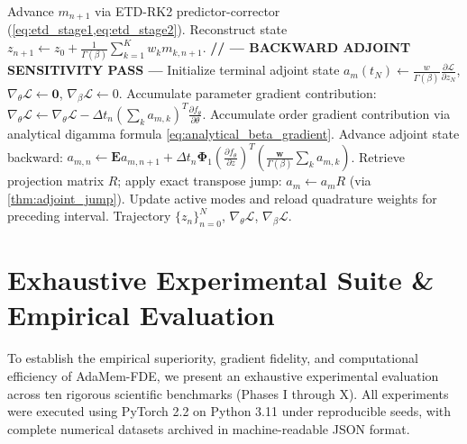 \documentclass[11pt,a4paper]{article}
\theoremstyle{plain}
\theoremstyle{definition}
\newcommand{\dt}{\Delta t}
\begin{document}
\begin{algorithm}[H]
\begin{algorithmic}[1]
    \State Advance $m_{n+1}$ via ETD-RK2 predictor-corrector (\cref{eq:etd_stage1,eq:etd_stage2}).
    \State Reconstruct state $z_{n+1} \leftarrow z_0 + \frac{1}{\Gamma(\beta)} \sum_{k=1}^K w_k m_{k, n+1}$.
\EndFor
\Statex \textbf{// --- BACKWARD ADJOINT SENSITIVITY PASS ---}
\State Initialize terminal adjoint state $a_m(t_N) \leftarrow \frac{w}{\Gamma(\beta)} \frac{\partial \mathcal{L}}{\partial z_N}$, $\nabla_\theta \mathcal{L} \leftarrow \mathbf{0}$, $\nabla_\beta \mathcal{L} \leftarrow 0$.
    \State Accumulate parameter gradient contribution: $\nabla_\theta \mathcal{L} \leftarrow \nabla_\theta \mathcal{L} - \dt_n \left( \sum_k a_{m, k} \right)^T \frac{\partial f_\theta}{\partial \theta}$.
    \State Accumulate order gradient contribution via analytical digamma formula \cref{eq:analytical_beta_gradient}.
    \State Advance adjoint state backward: $a_{m, n} \leftarrow \mathbf{E} a_{m, n+1} + \dt_n \mathbf{\Phi}_1 \left( \frac{\partial f_\theta}{\partial z} \right)^T \left( \frac{\bm{w}}{\Gamma(\beta)} \sum_k a_{m, k} \right)$.
        \State Retrieve projection matrix $R$; apply exact transpose jump: $a_m \leftarrow a_m R$ (via \cref{thm:adjoint_jump}).
        \State Update active modes and reload quadrature weights for preceding interval.
    \EndIf
\EndFor
\State \Return Trajectory $\{z_n\}_{n=0}^N$, $\nabla_\theta \mathcal{L}$, $\nabla_\beta \mathcal{L}$.
\end{algorithmic}
\end{algorithm}

\section{Exhaustive Experimental Suite \& Empirical Evaluation}
\label{sec:experiments}

To establish the empirical superiority, gradient fidelity, and computational efficiency of AdaMem-FDE, we present an exhaustive experimental evaluation across ten rigorous scientific benchmarks (Phases I through X). All experiments were executed using PyTorch 2.2 on Python 3.11 under reproducible seeds, with complete numerical datasets archived in machine-readable JSON format.
\end{document}
